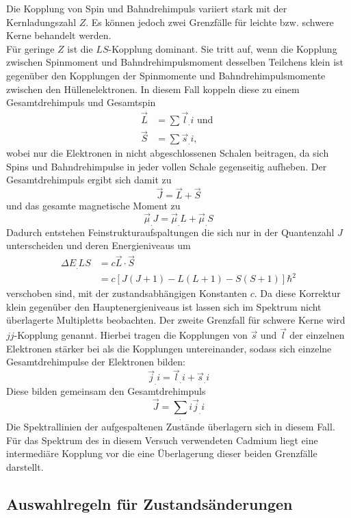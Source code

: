Die Kopplung von Spin und Bahndrehimpuls variiert stark mit der Kernladungszahl $Z$. Es können jedoch zwei Grenzfälle für leichte bzw. schwere Kerne behandelt werden.\\
Für geringe $Z$ ist die $LS$-Kopplung dominant. Sie tritt auf, wenn die Kopplung zwischen Spinmoment und Bahndrehimpulsmoment desselben Teilchens klein ist gegenüber den Kopplungen der Spinmomente und Bahndrehimpulsmomente zwischen den Hüllenelektronen. In diesem Fall koppeln diese zu einem Gesamtdrehimpuls und Gesamtspin 
\begin{align*}
\vec{L} &= \sum \vec{l}_.i \text { und }\\
\vec{S} &= \sum \vec{s}_.i,
\end{align*}
wobei nur die Elektronen in nicht abgeschlossenen Schalen beitragen, da sich Spins und Bahndrehimpulse in jeder vollen Schale gegenseitig aufheben.
Der Gesamtdrehimpuls ergibt sich damit zu
\[
\vec{J}=\vec{L}+\vec{S}
\]
und das gesamte magnetische Moment zu
\begin{equation}
\vec{\mu}_.J=\vec{\mu}_.L+\vec{\mu}_.S \label{eq:mu_ges}
\end{equation}
Dadurch entstehen Feinstrukturaufspaltungen die sich nur in der Quantenzahl $J$ unterscheiden und deren Energieniveaus um
\begin{align*}
\Delta E_.{LS} &= c \vec{L}\cdot\vec{S}\\
&= c \left[J(J+1)-L(L+1)-S(S+1)\right]\hbar^2
\end{align*}
verschoben sind, mit der zustandsabhängigen Konstanten $c$. Da diese Korrektur klein gegenüber den Hauptenergieniveaus ist lassen sich im Spektrum nicht überlagerte Multipletts beobachten.
Der zweite Grenzfall für schwere Kerne wird $jj$-Kopplung genannt. Hierbei tragen die Kopplungen von $\vec{s}$ und $\vec{l}$ der einzelnen Elektronen stärker bei als die Kopplungen untereinander, sodass sich einzelne Gesamtdrehimpulse der Elektronen bilden:
\[
\vec{j}_.i=\vec{l}_.i+\vec{s}_.i
\]
Diese bilden gemeinsam den Gesamtdrehimpuls
\[
\vec{J}=\sum_.i \vec{j}_.i
\]
Die Spektrallinien der aufgespaltenen Zustände überlagern sich in diesem Fall.
Für das Spektrum des in diesem Versuch verwendeten Cadmium liegt eine intermediäre Kopplung vor die eine Überlagerung dieser beiden Grenzfälle darstellt.

\subsection{Auswahlregeln für Zustandsänderungen}

